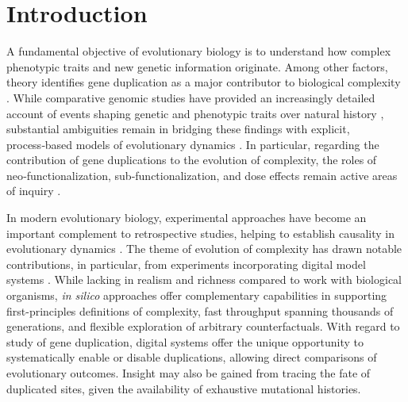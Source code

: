 \section{Introduction} \label{sec:introduction}

A fundamental objective of evolutionary biology is to understand how complex phenotypic traits and new genetic information originate.
Among other factors, theory identifies gene duplication as a major contributor to biological complexity \citep{Zhang2003,Otto2000,Wagner2008,Wagner2007,Crow:2006role,Magadum:2013wu,Metz:chromosomeDuplication1947}.
While comparative genomic studies have provided an increasingly detailed account of events shaping genetic and phenotypic traits over natural history \citep{Zhang2014}, substantial ambiguities remain in bridging these findings with explicit, process‑based models of evolutionary dynamics \citep{Welch2016}.
In particular, regarding the contribution of gene duplications to the evolution of complexity, the roles of neo‑functionalization, sub‑functionalization, and dose effects remain active areas of inquiry \citep{Innan2010}.

In modern evolutionary biology, experimental approaches have become an important complement to retrospective studies, helping to establish causality in evolutionary dynamics \citep{Kawecki2012}.
The theme of evolution of complexity has drawn notable contributions, in particular, from experiments incorporating digital model systems \citep{Fortuna2022}.
While lacking in realism and richness compared to work with biological organisms, \textit{in silico} approaches offer complementary capabilities in supporting first-principles definitions of complexity, fast throughput spanning thousands of generations, and flexible exploration of arbitrary counterfactuals.
With regard to study of gene duplication, digital systems offer the unique opportunity to systematically enable or disable duplications, allowing direct comparisons of evolutionary outcomes.
Insight may also be gained from tracing the fate of duplicated sites, given the availability of exhaustive mutational histories.


